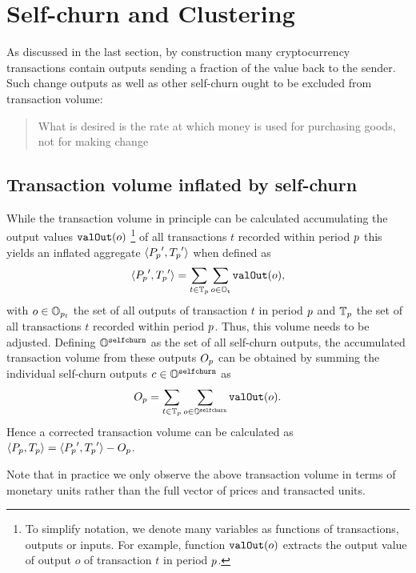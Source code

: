 \section{Self-churn and Clustering}
\label{sec:particularities_txvol}%
% 
As discussed in the last section, by construction many cryptocurrency
transactions contain outputs sending a fraction of the value back to the
sender. %
Such change outputs as well as other self-churn ought to be excluded from
transaction volume: %
%
\blockquote[%
\cite{fisher1922purch}%
]{%
  What is desired is the rate at which money is used for purchasing %
  goods, not for making change
}. %

\subsection{Transaction volume inflated by self-churn}
\label{sec:particularities_txvol:inflated}%
While the transaction volume in principle can be calculated accumulating the
output values ${\mathtt{valOut}}(o)$%
\footnote{To simplify notation, we denote many variables as functions of
  transactions, outputs or inputs. %
  For example, function ${\mathtt{valOut}}(o)$ extracts the output value of output \(o\)
  of transaction \(t\) in period \({p}\).} %
of all transactions $t$ recorded within period ${p}$ this yields an
inflated aggregate $\langle{P_{p}}',{T_{p}}'\rangle$ when defined as
\begin{align}%
  \langle\Pp',\Tp'\rangle = \sum_{t\in\TxP}\sum_{o\in\Out_\mathtt{t}} \valO(o),%
\end{align} %
with $o\in{\mathbb{O}}_{{p}_t}$ the set of all outputs of transaction $t$ in period
${p}$ and \({\mathbb{T}_{p}}\) the set of all transactions $t$ recorded within %
period ${p}$.  Thus, this volume needs to be adjusted. %
Defining ${\mathbb{O}}^{{\mathtt{selfchurn}}}$ as the set of all self-churn outputs, the
accumulated transaction volume from these outputs ${O_{p}}$ can be obtained by
summing the individual self-churn outputs $c \in {\mathbb{O}}^{{\mathtt{selfchurn}}}$ as%
\begin{align}%
  \Op = \sum_{t\in\TxP} \sum_{o\in\Out^{\selfchurn}} \valO(o).%
\end{align}%
Hence a corrected transaction volume can be calculated as %
$\langle{P_{p}},{T_{p}}\rangle= \langle{P_{p}}',{T_{p}}'\rangle - {O_{p}}$.

Note that in practice we only observe the above transaction volume in terms
of monetary units rather than the full vector of prices and transacted
units. %

